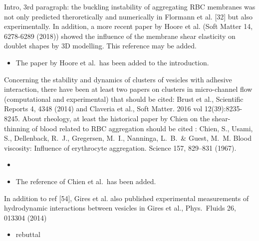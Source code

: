 \documentclass[11pt]{article}
\newcommand{\comment}[1]{{\color{blue} #1}}
\begin{document}
\noindent
\comment{Intro, 3rd paragraph: the buckling instability of aggregating RBC
membranes was not only predicted theroretically and numerically in
Flormann et al. [32] but also experimentally. In addition, a more
recent paper by Hoore et al. (Soft Matter 14, 6278-6289 (2018)) showed
the influence of the membrane shear elasticity on doublet shapes by 3D
modelling. This reference may be added.}
\begin{itemize}
  \item The paper by Hoore et al.~has been added to the introduction.
\end{itemize}

\noindent
\comment{Concerning the stability and dynamics of clusters of vesicles with
adhesive interaction, there have been at least two papers on clusters
in micro-channel flow (computational and experimental) that should be
cited: Brust et al., Scientific Reports 4, 4348 (2014) and Claveria et
al., Soft Matter. 2016 vol 12(39):8235-8245. About rheology, at least
the historical paper by Chien on the shear-thinning of blood related
to RBC aggregation should be cited : Chien, S., Usami, S., Dellenback,
R.~J., Gregersen, M.~I., Nanninga, L.~B.~\& Guest, M.~M. Blood
viscosity: Influence of erythrocyte aggregation. Science 157, 829–831
(1967).}
\begin{itemize}
  \item {}
  \item The reference of Chien et al.~has been added.
\end{itemize}

\noindent
\comment{In addition to ref [54], Gires et al. also published experimental
measurements of hydrodynamic interactions between vesicles in Gires et
al., Phys.~Fluids 26, 013304 (2014)}
\begin{itemize}
  \item rebuttal
\end{itemize}
\end{document}
